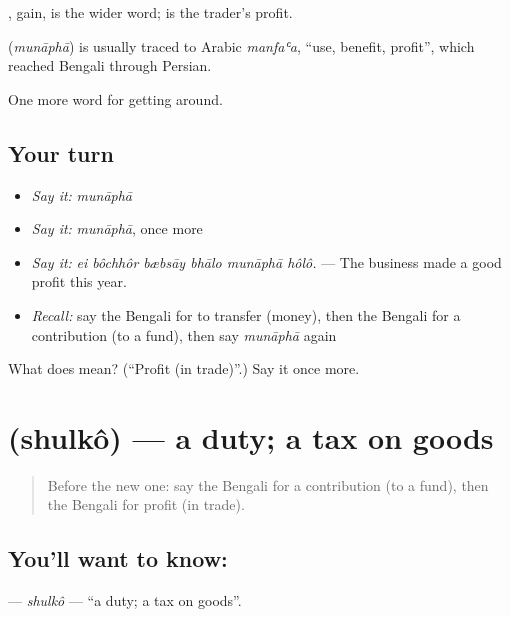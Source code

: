 , gain, is the wider word;  is the trader's profit.

\begin{cousinweb}
\textbf{} (\emph{munāphā}) is usually traced to Arabic \emph{manfaʿa}, \textquotedblleft{}use, benefit, profit\textquotedblright{}, which reached Bengali through Persian.
\end{cousinweb}

\begin{grammarlens}[title={What you've built}]
One more word for getting around.
\end{grammarlens}

\subsection*{Your turn}
\begin{itemize}
\raggedright
  \item \emph{Say it:} \emph{munāphā}
  \item \emph{Say it:} \emph{munāphā}, once more
  \item \emph{Say it:} \emph{ei bôchhôr bæbsāy bhālo munāphā hôlô.} — The business made a good profit this year.
  \item \emph{Recall:} say the Bengali for to transfer (money), then the Bengali for a contribution (to a fund), then say \emph{munāphā} again
\end{itemize}

\begin{tcolorbox}[breakable,colback=teal!4,colframe=teal!35!black,title={Before you move on}]
What does  mean? (\textquotedblleft{}Profit (in trade)\textquotedblright{}.) Say it once more.
\end{tcolorbox}
\section[\texorpdfstring{\bn{শুল্ক} (shulkô)}{শুল্ক (shulkô)}]{ (shulkô) — a duty; a tax on goods}

\label{lesson:BN-C418-shulko}



\begin{quote}
Before the new one: say the Bengali for a contribution (to a fund), then the Bengali for profit (in trade).
\end{quote}

\subsection*{You'll want to know: }
\textbf{} — \emph{shulkô} — \textquotedblleft{}a duty; a tax on goods\textquotedblright{}.

